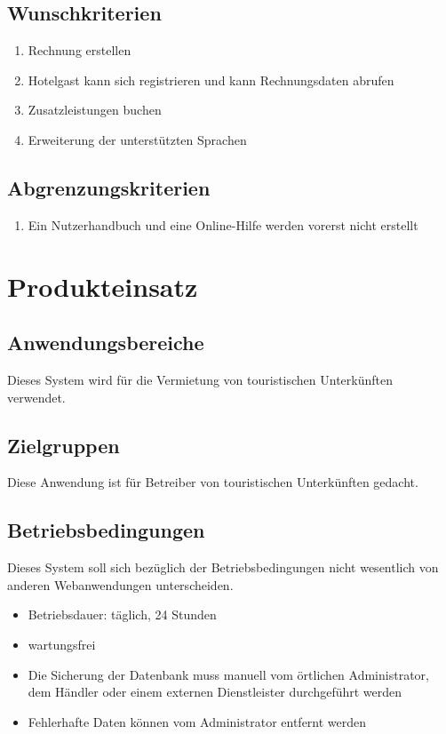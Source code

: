 \documentclass[a4paper,oneside]{scrreprt}
\begin{document}
\section{Wunschkriterien}

\begin{enumerate}
\item Rechnung erstellen
\item Hotelgast kann sich registrieren und kann Rechnungsdaten abrufen
\item Zusatzleistungen buchen
\item Erweiterung der unterstützten Sprachen
\end{enumerate}

\section{Abgrenzungskriterien}
\begin{enumerate}
\item Ein Nutzerhandbuch und eine Online-Hilfe werden vorerst nicht erstellt
\end{enumerate}





\chapter{Produkteinsatz}
\section{Anwendungsbereiche}

Dieses System wird für die Vermietung von touristischen Unterkünften verwendet.


\section{Zielgruppen}

Diese Anwendung ist für Betreiber von touristischen Unterkünften gedacht.

\section{Betriebsbedingungen}
Dieses System soll sich bezüglich der Betriebsbedingungen nicht wesentlich von anderen Webanwendungen unterscheiden.

\begin{itemize}
\item Betriebsdauer: täglich, 24 Stunden
\item wartungsfrei
\item Die Sicherung der Datenbank muss manuell vom örtlichen Administrator, dem Händler oder einem externen Dienstleister durchgeführt werden
\item Fehlerhafte Daten können vom Administrator entfernt werden
\end{itemize}
\end{document}

